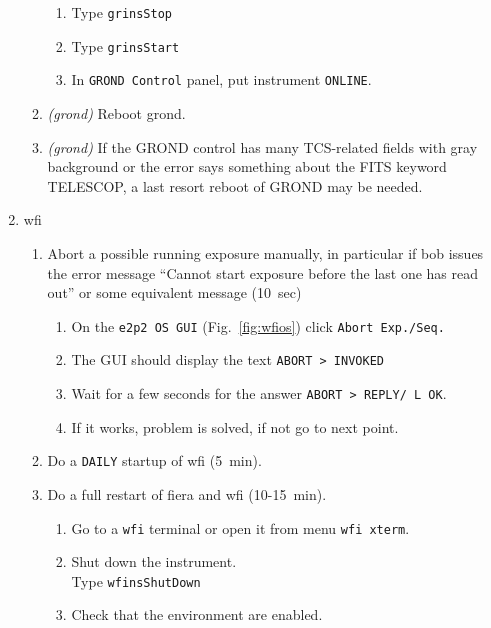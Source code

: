 \documentclass[11pt,fleqn]{book} %
\begin{document}
\begin{enumerate}
\begin{enumerate}
         \begin{enumerate}
           \item Type \texttt{grinsStop}
           \item Type \texttt{grinsStart}
           \item In \texttt{GROND Control} panel, put instrument \texttt{ONLINE}.
         \end{enumerate}
       \item \textit{(\gls{grond})} Reboot \gls{grond}.
       \item \textit{(\gls{grond})} If the GROND control has many TCS-related fields with gray background or the error says something about the FITS keyword TELESCOP, a last resort reboot of GROND may be needed.
     \end{enumerate}
  \item\label{list:wfiexpocrash} \gls{wfi}
    \begin{enumerate}
      \item Abort a possible running exposure manually, in particular if \gls{bob} issues the error message
             ``Cannot start exposure before the last one has read out'' or some
             equivalent message (10~sec)
        \begin{enumerate}
           \item On the \texttt{e2p2 OS GUI} (Fig.~\ref{fig:wfios}) click \texttt{Abort Exp./Seq.}
           \item The GUI should display the text \texttt{ABORT    > INVOKED}
           \item Wait for a few seconds for the answer \texttt{ABORT    > REPLY/ L   OK}.
           \item If it works, problem is solved, if not go to next point.
        \end{enumerate}
      \item Do a \texttt{DAILY} startup of \gls{wfi} (5~min).
      \item\label{list:wfifierarestart} Do a full restart of \gls{fiera} and \gls{wfi} (10-15~min).
        \begin{enumerate}
          \item Go to a \texttt{wfi} terminal or open it from menu \texttt{wfi xterm}.
          \item Shut down the instrument.\\
                Type \texttt{wfinsShutDown}
          \item Check that the environment are enabled.
             \begin{enumerate}

\end{enumerate}
\end{enumerate}
\end{enumerate}
\end{enumerate}
\end{document}
